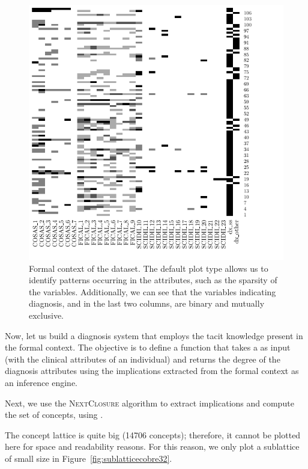 
\begin{figure}[t]
\centering\includegraphics[width=0.7\linewidth]{formal_context.pdf}
\caption{\label{fig:schizo}Formal context of the  dataset. The default plot type allows us to identify patterns occurring in the attributes, such as the sparsity of the  variables. Additionally, we can see that the variables indicating diagnosis,  and  in the last two columns, are binary and mutually exclusive.}
\end{figure}

Now, let us build a diagnosis system that employs the tacit knowledge
present in the formal context. The objective is to define a function
that takes a  as input (with the clinical attributes of an
individual) and returns the degree of the diagnosis attributes using the
implications extracted from the formal context as an inference engine.

Next, we use the \textsc{NextClosure} algorithm to extract implications
and compute the set of concepts, using .

The concept lattice is quite big (14706 concepts); therefore, it cannot
be plotted here for space and readability reasons. For this reason, we
only plot a sublattice of small size in
Figure~\ref{fig:sublatticecobre32}.

